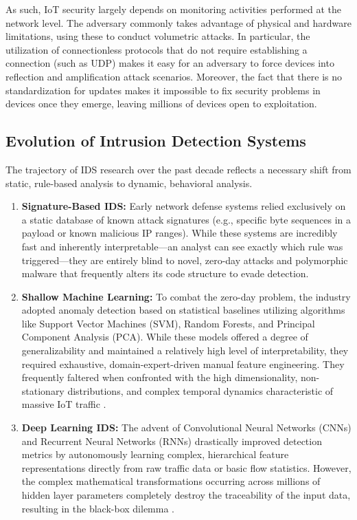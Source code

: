 \documentclass[12pt]{article}
\begin{document}
    As such, IoT security largely depends on monitoring activities performed at the network level. The adversary commonly takes advantage of physical and hardware limitations, using these to conduct volumetric attacks. In particular, the utilization of connectionless protocols that do not require establishing a connection (such as UDP) makes it easy for an adversary to force devices into reflection and amplification attack scenarios. Moreover, the fact that there is no standardization for updates makes it impossible to fix security problems in devices once they emerge, leaving millions of devices open to exploitation.

    \subsection{Evolution of Intrusion Detection Systems}
    The trajectory of IDS research over the past decade reflects a necessary shift from static, rule-based analysis to dynamic, behavioral analysis. 
    \begin{enumerate}
        \item \textbf{Signature-Based IDS:} Early network defense systems relied exclusively on a static database of known attack signatures (e.g., specific byte sequences in a payload or known malicious IP ranges). While these systems are incredibly fast and inherently interpretable—an analyst can see exactly which rule was triggered—they are entirely blind to novel, zero-day attacks and polymorphic malware that frequently alters its code structure to evade detection.
        \item \textbf{Shallow Machine Learning:} To combat the zero-day problem, the industry adopted anomaly detection based on statistical baselines utilizing algorithms like Support Vector Machines (SVM), Random Forests, and Principal Component Analysis (PCA). While these models offered a degree of generalizability and maintained a relatively high level of interpretability, they required exhaustive, domain-expert-driven manual feature engineering. They frequently faltered when confronted with the high dimensionality, non-stationary distributions, and complex temporal dynamics characteristic of massive IoT traffic \cite{jes2024iot}.
        \item \textbf{Deep Learning IDS:} The advent of Convolutional Neural Networks (CNNs) and Recurrent Neural Networks (RNNs) drastically improved detection metrics by autonomously learning complex, hierarchical feature representations directly from raw traffic data or basic flow statistics. However, the complex mathematical transformations occurring across millions of hidden layer parameters completely destroy the traceability of the input data, resulting in the black-box dilemma \cite{chen2022explainable}.
    \end{enumerate}
\end{document}
